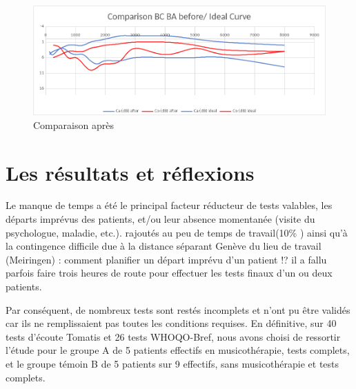 \begin{enumerate}
 \lipsum[1]
 
 \begin{figure}[bh]
 	\centering
 	\includegraphics[width=0.7\linewidth]{images/clinique/comparison_bc_ba_after_vs_ideal_curve_meyer.png}
 	\caption{Comparaison après}
 	\label{fig:comparisonbcbaaftervsidealcurvemeyer}
 \end{figure}
 
 	
 	
 \section{Les résultats et réflexions}	

Le manque de temps a été le principal facteur  réducteur
de tests valables, les départs imprévus des patients, et/ou leur
absence momentanée (visite du psychologue, maladie, etc.). rajoutés au peu de temps de travail(10\% ) ainsi qu'à la
contingence difficile due à la distance séparant Genève du lieu de travail (Meiringen)
: comment planifier un départ imprévu d'un patient !? il a fallu parfois
faire trois heures de route pour effectuer les tests finaux d'un ou deux
patients.
  
Par conséquent,  de nombreux tests sont restés 
incomplets et n'ont pu
être validés car ils ne remplissaient pas toutes les conditions requises.  En définitive, sur 40 tests d'écoute Tomatis et 26 tests
WHOQO-Bref, nous avons choisi de ressortir l'étude pour le groupe A de
5 patients effectifs en musicothérapie, tests complets, et le groupe
témoin B de 5 patients sur 9 effectifs, sans musicothérapie et tests
complets. 
 

  


\end{enumerate}
